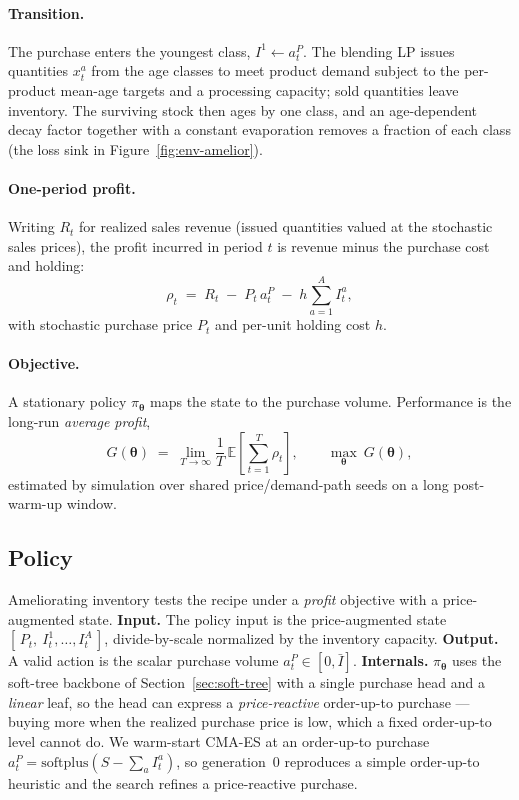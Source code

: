 \documentclass[11pt]{article}
\newcommand{\btheta}{\boldsymbol{\theta}}
\begin{document}
\paragraph{Transition.}
The purchase enters the youngest class, $I^{1}\!\leftarrow a^P_t$. The blending LP issues quantities
$x^{a}_t$ from the age classes to meet product demand subject to the per-product mean-age targets and a
processing capacity; sold quantities leave inventory. The surviving stock then ages by one class, and
an age-dependent decay factor together with a constant evaporation removes a fraction of each class
(the loss sink in Figure~\ref{fig:env-amelior}).

\paragraph{One-period profit.}
Writing $R_t$ for realized sales revenue (issued quantities valued at the stochastic sales prices),
the profit incurred in period $t$ is revenue minus the purchase cost and holding:
\begin{equation}
    \label{eq:amelior-profit}
    \rho_t \;=\; R_t \;-\; P_t\,a^P_t \;-\; h\sum_{a=1}^{A} I^{a}_t ,
\end{equation}
with stochastic purchase price $P_t$ and per-unit holding cost $h$.

\paragraph{Objective.}
A stationary policy $\pi_{\btheta}$ maps the state to the purchase volume. Performance is the long-run
\emph{average profit},
\begin{equation}
    \label{eq:amelior-objective}
    G(\btheta) \;=\; \lim_{T\to\infty}\frac{1}{T}\,\mathbb{E}\!\left[\sum_{t=1}^{T}\rho_t\right],
    \qquad \max_{\btheta}\ G(\btheta),
\end{equation}
estimated by simulation over shared price/demand-path seeds on a long post-warm-up window.

\FloatBarrier

\subsection{Policy}
\label{sec:amelior-policy}

Ameliorating inventory tests the recipe under a \emph{profit} objective with a price-augmented state.
\textbf{Input.} The policy input is the price-augmented state $[\,P_t,\ I^{1}_t,\dots,I^{A}_t\,]$,
divide-by-scale normalized by the inventory capacity. \textbf{Output.} A valid action is the scalar
purchase volume $a^P_t\in[0,\bar I]$. \textbf{Internals.} $\pi_{\btheta}$ uses the soft-tree backbone
of Section~\ref{sec:soft-tree} with a single purchase head and a \emph{linear} leaf, so the head can
express a \emph{price-reactive} order-up-to purchase --- buying more when the realized purchase price
is low, which a fixed order-up-to level cannot do. We warm-start CMA-ES at an order-up-to purchase
$a^P_t=\mathrm{softplus}\!\left(S-\sum_a I^{a}_t\right)$, so generation~0 reproduces a simple
order-up-to heuristic and the search refines a price-reactive purchase.
\end{document}
